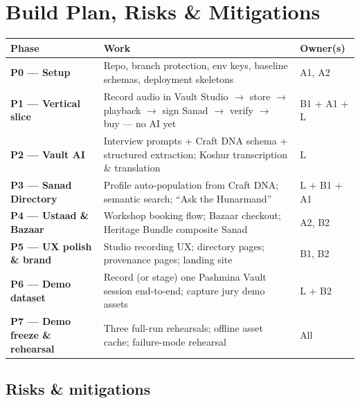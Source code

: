 \documentclass[11pt, a4paper]{article}
\begin{document}
\section{Build Plan, Risks \& Mitigations}

\begin{center}
\small
\begin{tabularx}{\linewidth}{>{\bfseries}lXX}
\toprule
Phase & Work & Owner(s) \\
\midrule
P0 — Setup & Repo, branch protection, env keys, baseline schemas, deployment skeletons & A1, A2 \\
P1 — Vertical slice & Record audio in Vault Studio $\to$ store $\to$ playback $\to$ sign Sanad $\to$ verify $\to$ buy --- no AI yet & B1 + A1 + L \\
P2 — Vault AI & Interview prompts + Craft DNA schema + structured extraction; Koshur transcription \& translation & L \\
P3 — Sanad Directory & Profile auto-population from Craft DNA; semantic search; ``Ask the Hunarmand'' & L + B1 + A1 \\
P4 — Ustaad \& Bazaar & Workshop booking flow; Bazaar checkout; Heritage Bundle composite Sanad & A2, B2 \\
P5 — UX polish \& brand & Studio recording UX; directory pages; provenance pages; landing site & B1, B2 \\
P6 — Demo dataset & Record (or stage) one Pashmina Vault session end-to-end; capture jury demo assets & L + B2 \\
P7 — Demo freeze \& rehearsal & Three full-run rehearsals; offline asset cache; failure-mode rehearsal & All \\
\bottomrule
\end{tabularx}
\end{center}

\subsection{Risks \& mitigations}
\end{document}
